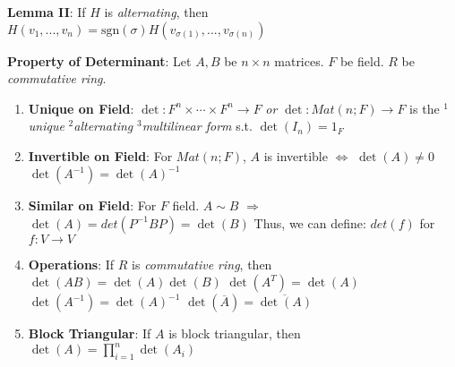 \documentclass[9pt]{article}
\begin{document}
\quad \textbf{Lemma II}: If $H$ is \textit{alternating}, then \quad $H(v_1,...,v_n)=\text{sgn}(\sigma)H(v_{\sigma(1)},...,v_{\sigma(n)})$ 

\textbf{Property of Determinant}: Let $A,B$ be $n\times n$ matrices. \quad $F$ be field. \quad $R$ be \textit{commutative ring}.
\begin{enumerate}[itemsep=-2pt, topsep=-2pt]
    \item \textbf{Unique on Field}: $\det:F^n\times \cdots\times F^n\to F$ \textit{or} $\det: Mat(n;F) \to F$ is the $^1$\textit{unique} $^2$\textit{alternating} $^3$\textit{multilinear form} s.t. $\det(I_n)=1_F$
    \item \textbf{Invertible on Field}: For $Mat(n;F)$, $A$ is invertible $\Leftrightarrow$ $\det(A)\ne0$ \quad $\det(A^{-1})=\det(A)^{-1}$ 
    \item \textbf{Similar on Field}: For $F$ field. \quad $A\sim B$ $\Rightarrow$ $\det(A)=det(P^{-1}BP)=\det(B)$ \qquad Thus, we can define: $det(f)$ for $f:V\to V$
    \item \textbf{Operations}: {\scriptsize If $R$ is \textit{commutative ring}}, then $\det(AB)=\det(A)\det(B)$ \quad $\det(A^T)=\det(A)$  \quad $\det(A^{-1})=\det(A)^{-1}$ \quad $\det(\overline{A})=\overline{\det(A)}$
    \item \textbf{Block Triangular}: If $A$ is block triangular, then $\det(A)=\prod_{i=1}^n\det(A_i)$ 
\end{enumerate}
\end{document}
